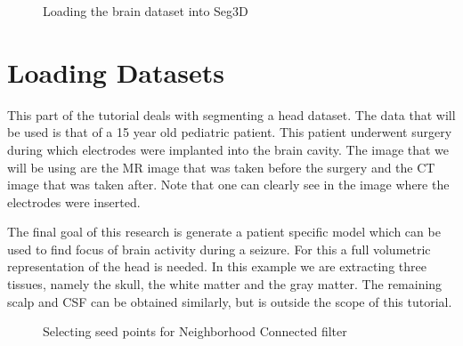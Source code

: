 \documentclass[fleqn,11pt,openany]{book}
\begin{document}
\begin{figure}
\caption{Loading the brain dataset into Seg3D}\label{fig:LoadingBrainDataSet}
\end{figure}

\section{Loading Datasets}

This part of the tutorial deals with segmenting a head dataset. The data that will be used is that of a 15 year old pediatric patient. This patient underwent surgery during which electrodes were implanted into the brain cavity. The image that we will be using are the MR image that was taken before the surgery and the CT image that was taken after. Note that one can clearly see in the image where the electrodes were inserted.

The final goal of this research is generate a patient specific model which can be used to find focus of brain activity during a seizure. For this a full volumetric representation of the head is needed. In this example we are extracting three tissues, namely the skull, the white matter and the gray matter. The remaining scalp and CSF can be obtained similarly, but is outside the scope of this tutorial.

\begin{figure}
\caption{Selecting seed points for Neighborhood Connected filter}\label{fig:NeighborhoodConnected}
\end{figure}
\end{document}
